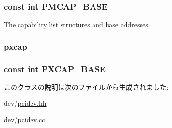 \label{classPciDevice_ad40e66fa09f69d8ab4617217b7f1c62e}
\hypertarget{classPciDevice_ae644f63414585f6d3398caee03da3969}{
\subsubsection[{PMCAP\_\-BASE}]{\setlength{\rightskip}{0pt plus 5cm}const int {\bf PMCAP\_\-BASE}}}
\label{classPciDevice_ae644f63414585f6d3398caee03da3969}
The capability list structures and base addresses \hypertarget{classPciDevice_a88e9ccb85708bfe445318375e8738ec8}{
\subsubsection[{pxcap}]{ {\bf pxcap}}}
\label{classPciDevice_a88e9ccb85708bfe445318375e8738ec8}
\hypertarget{classPciDevice_a7058a632ee6e497e2b436d06064716a0}{
\subsubsection[{PXCAP\_\-BASE}]{\setlength{\rightskip}{0pt plus 5cm}const int {\bf PXCAP\_\-BASE}}}
\label{classPciDevice_a7058a632ee6e497e2b436d06064716a0}


このクラスの説明は次のファイルから生成されました:\begin{DoxyCompactItemize}
\item 
dev/\hyperlink{pcidev_8hh}{pcidev.hh}\item 
dev/\hyperlink{pcidev_8cc}{pcidev.cc}\end{DoxyCompactItemize}
